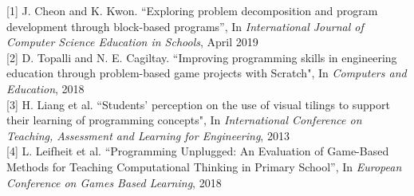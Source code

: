[1] J. Cheon and K. Kwon. “Exploring problem decomposition and program
development through block-based programs”, In \textit{International Journal of
Computer Science Education in Schools}, April 2019\\

[2] D. Topalli and N. E. Cagiltay. ``Improving programming skills in engineering 
education through problem-based game projects with Scratch", In 
\textit{Computers and Education}, 2018\\

[3] H. Liang et al. ``Students' perception on the use of visual tilings to support their
learning of programming concepts", In \textit{International Conference on Teaching, 
Assessment and Learning for Engineering}, 2013\\

[4] L. Leifheit et al. “Programming Unplugged: An Evaluation of Game-Based
Methods for Teaching Computational Thinking in Primary School”, In
\textit{European Conference on Games Based Learning}, 2018\\